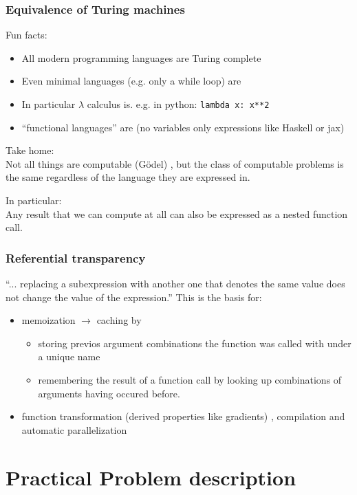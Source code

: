 \documentclass[t]{beamer}
\begin{document}
\begin{frame}
\frametitle{Equivalence of Turing machines}
Fun facts:
\begin{itemize}
  \pause
    \item All modern programming languages are Turing complete 
  \pause
    \item Even minimal languages (e.g. only a while loop) are 
  \pause
    \item In particular $\lambda$ calculus is. 
          e.g. in python: \texttt{lambda x: x**2}
  \pause
    \item ``functional languages'' are 
    (no variables only expressions like Haskell or  jax) 

  \pause
\end{itemize}
Take home: \\
Not all things are computable (Gödel) , 
but the class of computable problems is the same regardless of the language they are expressed in.

In particular: \\
\alert{Any result} that we can compute at all \alert{can} also \alert{be expressed as a nested function call}. 
\end{frame}

\begin{frame}
\frametitle{Referential transparency}

``... replacing a subexpression with another one that denotes the same value does not change the value of the expression.''
This is the basis for:
\begin{itemize}
\item memoization $\rightarrow$ caching by
\begin{itemize}
\item
  storing previos argument combinations the function was called with under a unique name
\item
  remembering the result of a function call by looking up combinations of arguments having occured before.
\end{itemize}
\item function transformation (derived properties like gradients) , compilation and automatic parallelization
\end{itemize}
\end{frame}


\section{Practical Problem description}
\end{document}
